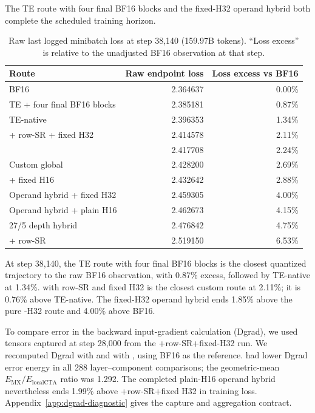 The TE route with four final BF16 blocks and the fixed-H32 operand hybrid both
complete the scheduled training horizon.

\begin{table}[H]
  \centering
  \caption{Raw last logged minibatch loss at step 38,140 (159.97B tokens).
  ``Loss excess'' is relative to the unadjusted BF16 observation at that step.}
  \label{tab:training-endpoints}
  \begin{tabularx}{\textwidth}{Yrr}
    \toprule
    Route & Raw endpoint loss & Loss excess vs BF16 \\
    \midrule
    BF16 & 2.364637 & 0.00\% \\
    TE \nvfp{} + four final BF16 blocks & 2.385181 & 0.87\% \\
    TE-native \nvfp{} & 2.396353 & 1.34\% \\
    \mxfp{} + row-SR + fixed H32 & 2.414578 & 2.11\% \\
    \localcta{} & 2.417708 & 2.24\% \\
    Custom global \nvfp{} & 2.428200 & 2.69\% \\
    \localcta{} + fixed H16 & 2.432642 & 2.88\% \\
    Operand hybrid + fixed H32 & 2.459305 & 4.00\% \\
    Operand hybrid + plain H16 & 2.462673 & 4.15\% \\
    27/5 depth hybrid & 2.476842 & 4.75\% \\
    \mxfp{} + row-SR & 2.519150 & 6.53\% \\
    \bottomrule
  \end{tabularx}
\end{table}

At step 38,140, the TE route with four final BF16 blocks is the closest
quantized trajectory to the raw BF16 observation, with 0.87\% excess, followed
by TE-native at 1.34\%. \mxfp{} with row-SR and fixed H32 is the closest custom
route at 2.11\%; it is 0.76\% above TE-native. The fixed-H32 operand hybrid
ends 1.85\% above the pure \mxfp{}-H32 route and 4.00\% above BF16.

To compare error in the backward input-gradient calculation (Dgrad), we used
tensors captured at step 28,000 from the \mxfp{}+row-SR+fixed-H32 run. We
recomputed Dgrad with \localcta{} and with \mxfp{}, using BF16 as the
reference. \localcta{} had lower Dgrad error energy in all 288
layer--component comparisons; the geometric-mean
$E_{\mathrm{MX}}/E_{\mathrm{localCTA}}$ ratio was 1.292. The completed
plain-H16 operand hybrid nevertheless ends 1.99\% above \mxfp{}+row-SR+fixed H32 in
training loss. Appendix~\ref{app:dgrad-diagnostic} gives the capture and
aggregation contract.

